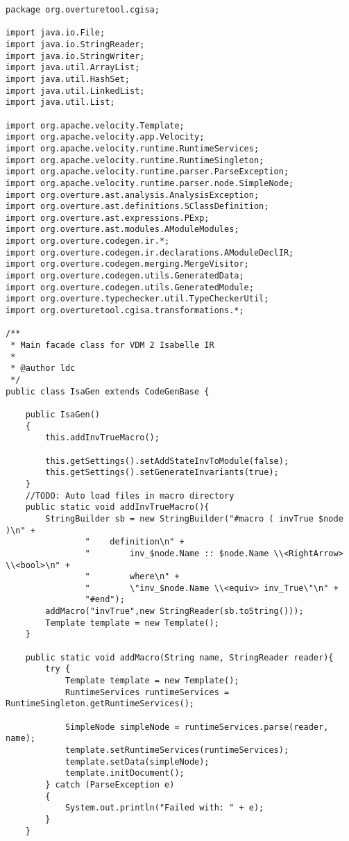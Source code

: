 \begin{appendices}
\begin{lstlisting}
package org.overturetool.cgisa;

import java.io.File;
import java.io.StringReader;
import java.io.StringWriter;
import java.util.ArrayList;
import java.util.HashSet;
import java.util.LinkedList;
import java.util.List;

import org.apache.velocity.Template;
import org.apache.velocity.app.Velocity;
import org.apache.velocity.runtime.RuntimeServices;
import org.apache.velocity.runtime.RuntimeSingleton;
import org.apache.velocity.runtime.parser.ParseException;
import org.apache.velocity.runtime.parser.node.SimpleNode;
import org.overture.ast.analysis.AnalysisException;
import org.overture.ast.definitions.SClassDefinition;
import org.overture.ast.expressions.PExp;
import org.overture.ast.modules.AModuleModules;
import org.overture.codegen.ir.*;
import org.overture.codegen.ir.declarations.AModuleDeclIR;
import org.overture.codegen.merging.MergeVisitor;
import org.overture.codegen.utils.GeneratedData;
import org.overture.codegen.utils.GeneratedModule;
import org.overture.typechecker.util.TypeCheckerUtil;
import org.overturetool.cgisa.transformations.*;

/**
 * Main facade class for VDM 2 Isabelle IR
 *
 * @author ldc
 */
public class IsaGen extends CodeGenBase {

    public IsaGen()
    {
        this.addInvTrueMacro();

        this.getSettings().setAddStateInvToModule(false);
        this.getSettings().setGenerateInvariants(true);
    }
    //TODO: Auto load files in macro directory
    public static void addInvTrueMacro(){
        StringBuilder sb = new StringBuilder("#macro ( invTrue $node )\n" +
                "    definition\n" +
                "        inv_$node.Name :: $node.Name \\<RightArrow> \\<bool>\n" +
                "        where\n" +
                "        \"inv_$node.Name \\<equiv> inv_True\"\n" +
                "#end");
        addMacro("invTrue",new StringReader(sb.toString()));
        Template template = new Template();
    }

    public static void addMacro(String name, StringReader reader){
        try {
            Template template = new Template();
            RuntimeServices runtimeServices = RuntimeSingleton.getRuntimeServices();

            SimpleNode simpleNode = runtimeServices.parse(reader, name);
            template.setRuntimeServices(runtimeServices);
            template.setData(simpleNode);
            template.initDocument();
        } catch (ParseException e)
        {
            System.out.println("Failed with: " + e);
        }
    }


\end{lstlisting}
\end{appendices}
